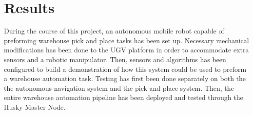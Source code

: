 \chapter{Results}\label{sec:Results}

During the course of this project, an autonomous mobile robot capable of preforming warehouse pick and place tasks has been set up. Necessary mechanical modifications has been done to the UGV platform in order to accommodate extra sensors and a robotic manipulator. Then, sensors and algorithms has been configured to build a demonstration of how this system could be used to preform a warehouse automation task. Testing has first been done separately on both the the autonomous navigation system and the pick and place system. Then, the entire warehouse automation pipeline has been deployed and tested through the Husky Master Node.







